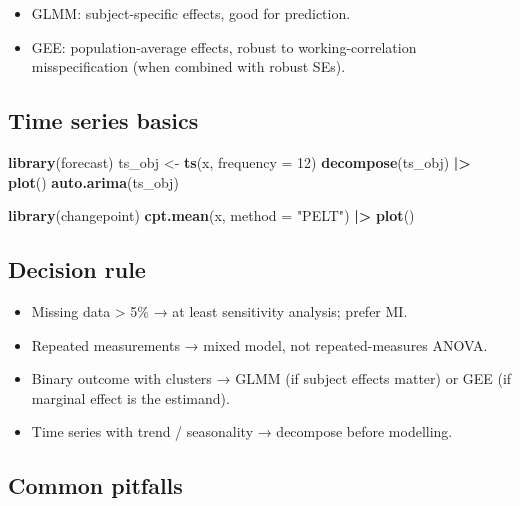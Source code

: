 \documentclass[
]{article}
\newenvironment{Shaded}{\begin{snugshade}}{\end{snugshade}}
\newcommand{\AttributeTok}[1]{\textcolor[rgb]{0.13,0.29,0.53}{#1}}
\newcommand{\DecValTok}[1]{\textcolor[rgb]{0.00,0.00,0.81}{#1}}
\newcommand{\FunctionTok}[1]{\textcolor[rgb]{0.13,0.29,0.53}{\textbf{#1}}}
\newcommand{\NormalTok}[1]{#1}
\newcommand{\OtherTok}[1]{\textcolor[rgb]{0.56,0.35,0.01}{#1}}
\newcommand{\SpecialCharTok}[1]{\textcolor[rgb]{0.81,0.36,0.00}{\textbf{#1}}}
\newcommand{\StringTok}[1]{\textcolor[rgb]{0.31,0.60,0.02}{#1}}
\providecommand{\tightlist}{%
  \setlength{\itemsep}{0pt}\setlength{\parskip}{0pt}}
\begin{document}
\begin{itemize}
\tightlist
\item
  GLMM: subject-specific effects, good for prediction.
\item
  GEE: population-average effects, robust to working-correlation
  misspecification (when combined with robust SEs).
\end{itemize}

\subsection{Time series basics}\label{time-series-basics}

\begin{Shaded}
\begin{Highlighting}[]
\FunctionTok{library}\NormalTok{(forecast)}
\NormalTok{ts\_obj }\OtherTok{\textless{}{-}} \FunctionTok{ts}\NormalTok{(x, }\AttributeTok{frequency =} \DecValTok{12}\NormalTok{)}
\FunctionTok{decompose}\NormalTok{(ts\_obj) }\SpecialCharTok{|\textgreater{}} \FunctionTok{plot}\NormalTok{()}
\FunctionTok{auto.arima}\NormalTok{(ts\_obj)}

\FunctionTok{library}\NormalTok{(changepoint)}
\FunctionTok{cpt.mean}\NormalTok{(x, }\AttributeTok{method =} \StringTok{"PELT"}\NormalTok{) }\SpecialCharTok{|\textgreater{}} \FunctionTok{plot}\NormalTok{()}
\end{Highlighting}
\end{Shaded}

\subsection{Decision rule}\label{decision-rule-9}

\begin{itemize}
\tightlist
\item
  Missing data \textgreater{} 5\% → at least sensitivity analysis;
  prefer MI.
\item
  Repeated measurements → mixed model, not repeated-measures ANOVA.
\item
  Binary outcome with clusters → GLMM (if subject effects matter) or GEE
  (if marginal effect is the estimand).
\item
  Time series with trend / seasonality → decompose before modelling.
\end{itemize}

\subsection{Common pitfalls}\label{common-pitfalls-9}
\end{document}
